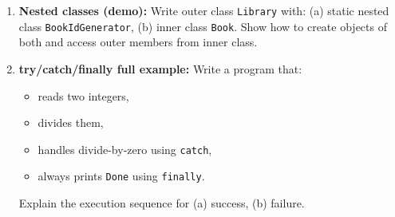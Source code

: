 \documentclass[11pt,a4paper]{article}
\begin{document}
\begin{enumerate}[label=M\arabic*., leftmargin=*]
  \item \textbf{Nested classes (demo):} Write outer class \texttt{Library} with:
    (a) static nested class \texttt{BookIdGenerator}, (b) inner class \texttt{Book}.
    Show how to create objects of both and access outer members from inner class.

  \item \textbf{try/catch/finally full example:} Write a program that:
    \begin{itemize}[leftmargin=*]
      \item reads two integers,
      \item divides them,
      \item handles divide-by-zero using \texttt{catch},
      \item always prints \texttt{Done} using \texttt{finally}.
    \end{itemize}
    Explain the execution sequence for (a) success, (b) failure.
\end{enumerate}
\end{document}
